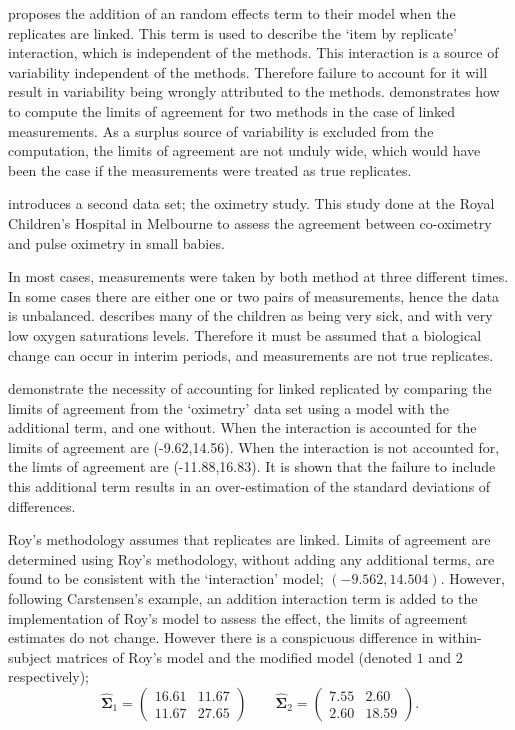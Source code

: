 \documentclass[12pt, a4paper]{report}
\theoremstyle{plain}
\theoremstyle{definition}
\theoremstyle{remark}
\begin{document}
	
	\citet{BXC2008} proposes the addition of an random effects term to their model when the replicates are linked. This term is used to describe the `item by replicate' interaction, which is independent of the methods. This interaction is a source of variability independent of the methods. Therefore failure to account for it will result in variability being wrongly attributed to the methods. \citet{BXC2008} demonstrates how to compute the limits of agreement for two methods in the case of linked measurements. As a surplus source of variability is excluded from the computation, the limits of agreement are not unduly wide, which would have been the case if the measurements were treated as true replicates.
	
	\citet{BXC2008} introduces a second data set; the oximetry study. This study done at the Royal Children's Hospital in
	Melbourne to assess the agreement between co-oximetry and pulse oximetry in small babies.
	
	In most cases, measurements were taken by both method at three different times. In some cases there are either one or two pairs of measurements, hence the data is unbalanced. \citet{BXC2008} describes many of the children as being very sick, and with very low oxygen saturations levels. Therefore it must be assumed that a biological change can occur in interim periods, and measurements are not true replicates.
	
	
	
	\citet{BXC2008} demonstrate the necessity of accounting for linked replicated by comparing the limits of agreement from the `oximetry' data set using a model with the additional term, and one without. When the interaction is accounted for the limits of agreement are (-9.62,14.56). When the interaction is not accounted for, the limts of agreement are (-11.88,16.83). It is shown that the failure to include this additional term results in an over-estimation of the standard deviations of differences.
	
	Roy's methodology assumes that replicates are linked. Limits of agreement are determined using Roy's methodology, without adding any additional terms, are found to be consistent with the `interaction' model; $(-9.562, 14.504 )$.  However, following Carstensen's example, an addition interaction term is added to the implementation of Roy's model to assess the effect, the limits of agreement estimates do not change. However there is a conspicuous difference in within-subject matrices of Roy's model and the modified model (denoted $1$ and $2$ respectively);
	\begin{equation}
	\hat{\boldsymbol{\Sigma}}_{1}= \left(\begin{array}{cc}
	16.61 &	11.67\\
	11.67 & 27.65 \end{array}\right) \qquad
	\boldsymbol{\hat{\Sigma}}_{2}= \left( \begin{array}{cc}
	7.55 & 2.60 \\
	2.60 & 18.59 \end{array} \right). 
	\end{equation}
	
\end{document}
